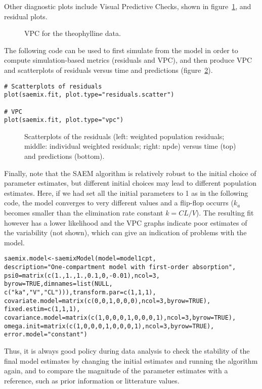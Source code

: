 {Other diagnostic plots include Visual Predictive Checks, shown in figure~\ref{fig:theovpc}, and residual plots. 
\begin{figure}[!h]
\par \kern -0.5cm
\begin{center}
\end{center}
\par \kern -0.5cm
\caption{VPC for the theophylline data.} \label{fig:theovpc}
\end{figure}

The following code can be used to first simulate from the model in order to compute simulation-based metrics (residuals and VPC), and then produce VPC and scatterplots of residuals versus time and predictions (figure~\ref{fig:theoresid}).

\begin{verbatim}
# Scatterplots of residuals
plot(saemix.fit, plot.type="residuals.scatter")

# VPC
plot(saemix.fit, plot.type="vpc")
\end{verbatim}

\begin{figure}[!h]
\begin{center}
\par \kern -0.5cm
\end{center}
\par \kern -0.5cm
\caption{Scatterplots of the residuals (left: weighted population residuals; middle: individual weighted residuals; right: npde) versus time (top) and predictions (bottom).} \label{fig:theoresid}
\end{figure}

Finally, note that the SAEM algorithm is relatively robust to the initial choice of parameter estimates, but different initial choices may lead to different population estimates. Here, if we had set all the initial parameters to 1 as in the following code, the model converges to very different values and a flip-flop occurrs ($k_a$ becomes smaller than the elimination rate constant $k=CL/V$). The resulting fit however has a lower likelihood and the VPC graphs indicate poor estimates of the variability (not shown), which can give an indication of problems with the model.
\begin{verbatim}
saemix.model<-saemixModel(model=model1cpt,
description="One-compartment model with first-order absorption",
psi0=matrix(c(1.,1.,1.,0.1,0,-0.01),ncol=3, byrow=TRUE,dimnames=list(NULL, 
c("ka","V","CL"))),transform.par=c(1,1,1), 
covariate.model=matrix(c(0,0,1,0,0,0),ncol=3,byrow=TRUE), fixed.estim=c(1,1,1), 
covariance.model=matrix(c(1,0,0,0,1,0,0,0,1),ncol=3,byrow=TRUE), 
omega.init=matrix(c(1,0,0,0,1,0,0,0,1),ncol=3,byrow=TRUE), error.model="constant")
\end{verbatim}
Thus, it is always good policy during data analysis to check the stability of the final model estimates by changing the initial estimates and running the algorithm again, and to compare the magnitude of the parameter estimates with a reference, such as prior information or litterature values.

}
